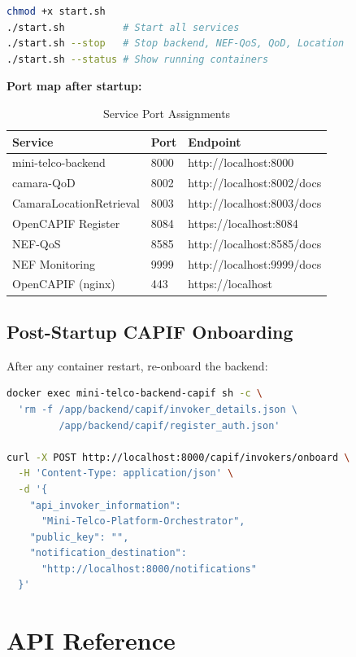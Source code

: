 \documentclass[conference]{IEEEtran}
\begin{document}
\begin{lstlisting}[language=bash]
chmod +x start.sh
./start.sh          # Start all services
./start.sh --stop   # Stop backend, NEF-QoS, QoD, Location
./start.sh --status # Show running containers
\end{lstlisting}

\textbf{Port map after startup:}

\begin{table}[H]
\centering
\caption{Service Port Assignments}
\label{tab:ports}
\scriptsize
\begin{tabular}{lll}
\toprule
\textbf{Service} & \textbf{Port} & \textbf{Endpoint} \\
\midrule
mini-telco-backend & 8000 & http://localhost:8000 \\
camara-QoD & 8002 & http://localhost:8002/docs \\
CamaraLocationRetrieval & 8003 & http://localhost:8003/docs \\
OpenCAPIF Register & 8084 & https://localhost:8084 \\
NEF-QoS & 8585 & http://localhost:8585/docs \\
NEF Monitoring & 9999 & http://localhost:9999/docs \\
OpenCAPIF (nginx) & 443 & https://localhost \\
\bottomrule
\end{tabular}
\end{table}

\subsection{Post-Startup CAPIF Onboarding}

After any container restart, re-onboard the backend:
\begin{lstlisting}[language=bash]
docker exec mini-telco-backend-capif sh -c \
  'rm -f /app/backend/capif/invoker_details.json \
         /app/backend/capif/register_auth.json'

curl -X POST http://localhost:8000/capif/invokers/onboard \
  -H 'Content-Type: application/json' \
  -d '{
    "api_invoker_information":
      "Mini-Telco-Platform-Orchestrator",
    "public_key": "",
    "notification_destination":
      "http://localhost:8000/notifications"
  }'
\end{lstlisting}

\section{API Reference}
\label{sec:api}
\end{document}
